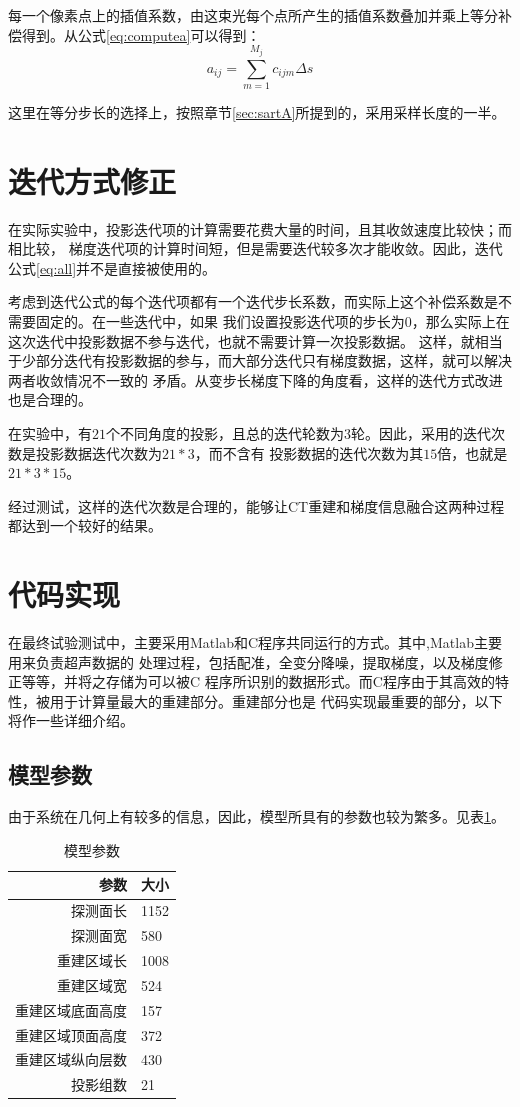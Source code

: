 每一个像素点上的插值系数，由这束光每个点所产生的插值系数叠加并乘上等分补偿得到。从公式\eqref{eq:computea}可以得到：
\begin{equation}\label{eq:computea}
a_{ij}=\sum^{M_j}_{m=1}c_{ijm}\Delta s
\end{equation}

这里在等分步长的选择上，按照章节\ref{sec:sartA}所提到的，采用采样长度的一半。

\section{迭代方式修正}
在实际实验中，投影迭代项的计算需要花费大量的时间，且其收敛速度比较快；而相比较，
梯度迭代项的计算时间短，但是需要迭代较多次才能收敛。因此，迭代公式\eqref{eq:all}并不是直接被使用的。

考虑到迭代公式的每个迭代项都有一个迭代步长系数，而实际上这个补偿系数是不需要固定的。在一些迭代中，如果
我们设置投影迭代项的步长为$0$，那么实际上在这次迭代中投影数据不参与迭代，也就不需要计算一次投影数据。
这样，就相当于少部分迭代有投影数据的参与，而大部分迭代只有梯度数据，这样，就可以解决两者收敛情况不一致的
矛盾。从变步长梯度下降的角度看，这样的迭代方式改进也是合理的。

在实验中，有$21$个不同角度的投影，且总的迭代轮数为$3$轮。因此，采用的迭代次数是投影数据迭代次数为$21*3$，而不含有
投影数据的迭代次数为其$15$倍，也就是$21*3*15$。

经过测试，这样的迭代次数是合理的，能够让CT重建和梯度信息融合这两种过程都达到一个较好的结果。

\section{代码实现}
在最终试验测试中，主要采用Matlab和C程序共同运行的方式。其中,Matlab主要用来负责超声数据的
处理过程，包括配准，全变分降噪，提取梯度，以及梯度修正等等，并将之存储为可以被C
程序所识别的数据形式。而C程序由于其高效的特性，被用于计算量最大的重建部分。重建部分也是
代码实现最重要的部分，以下将作一些详细介绍。

\subsection{模型参数}
由于系统在几何上有较多的信息，因此，模型所具有的参数也较为繁多。见表\ref{tab:para}。
\begin{table}[!h]
\center
\caption{模型参数}\label{tab:para}
\vspace{1pc}
\begin{tabular}{r|l}
\hline
参数        &     大小\\
\hline
探测面长     &   1152   \\
\hline
探测面宽    &     580 \\
\hline  
重建区域长   &   1008 \\
\hline 
重建区域宽  &  524 \\
\hline   
重建区域底面高度  &   157  \\
\hline
重建区域顶面高度  &   372   \\
\hline 
重建区域纵向层数  &  430   \\
\hline
投影组数       &  21 \\
\hline
\end{tabular}
\end{table}
